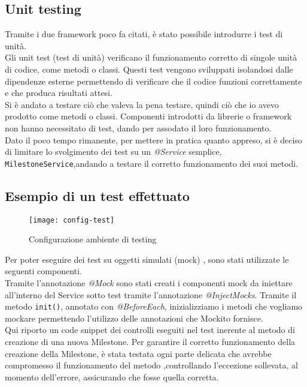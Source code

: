 \subsection{Unit testing}
Tramite i due framework poco fa citati, è stato possibile introdurre i test di unità.\\
Gli unit test (test di unità) verificano il funzionamento corretto di singole unità di codice, come metodi o classi. Questi test vengono sviluppati isolandosi dalle dipendenze esterne permettendo di verificare che il codice funzioni correttamente e che produca risultati attesi.\\
Si è andato a testare ciò che valeva la pena testare, quindi ciò che io avevo prodotto come metodi o classi. Componenti introdotti da librerie o framework non hanno necessitato di test, dando per assodato il loro funzionamento.\\
Dato il poco tempo rimanente, per mettere in pratica quanto appreso, si è deciso di limitare lo svolgimento dei test su un \textit{@Service} semplice, \texttt{MilestoneService},andando a testare il corretto funzionamento dei suoi metodi.

\subsection{Esempio di un test effettuato}
\begin{figure}[H] 
    \centering 
    \texttt{[image: config-test]} 
    \caption{Configurazione ambiente di testing}
\end{figure}
Per poter eseguire dei test su oggetti simulati (mock) , sono stati utilizzate le seguenti componenti.\\
Tramite l'annotazione \textit{@Mock} sono stati creati i componenti mock da iniettare all’interno del Service sotto test tramite l’annotazione \textit{@InjectMocks}. Tramite il metodo \texttt{init()}, annotato con \textit{@BeforeEach}, inizializziamo i metodi che vogliamo mockare permettendo l’utilizzo delle annotazioni che Mockito fornisce.\\
Qui riporto un code snippet dei controlli eseguiti nel test inerente al metodo di creazione di una nuova Milestone. Per garantire il corretto funzionamento della creazione della Milestone, è stata testata ogni parte delicata che avrebbe compromesso il funzionamento del metodo ,controllando l’eccezione sollevata, al momento dell’errore, assicurando che fosse quella corretta.\\


